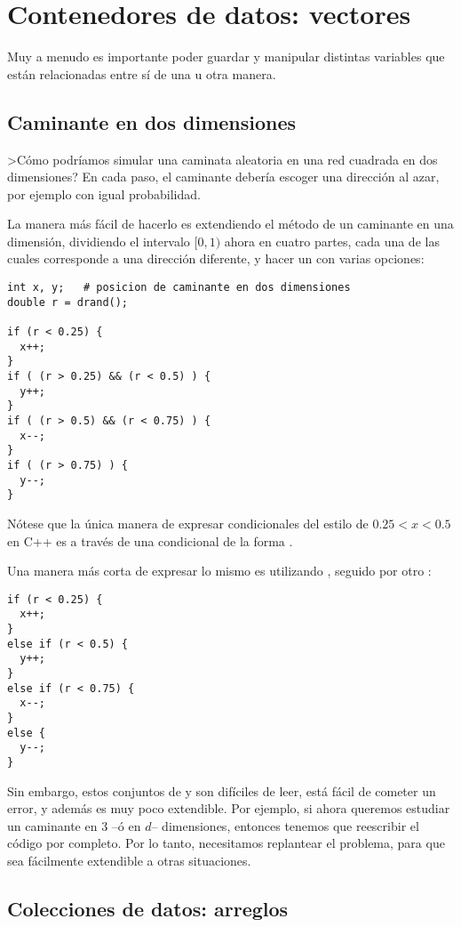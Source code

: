 \chapter{Contenedores de datos: vectores}

Muy a menudo es importante poder guardar y manipular distintas variables que
están relacionadas entre sí de una u otra manera.

\section{Caminante en dos dimensiones}

>Cómo podríamos simular una caminata aleatoria en una red cuadrada en dos
dimensiones? En cada paso, el caminante debería escoger una dirección al azar,
por ejemplo con igual probabilidad.

La manera más fácil de hacerlo es extendiendo el método de un caminante en una
dimensión, dividiendo el intervalo $[0,1)$ ahora en cuatro partes, cada una de
las cuales corresponde a una dirección diferente, y hacer un  con
varias opciones:
\begin{lstlisting}
int x, y;	# posicion de caminante en dos dimensiones
double r = drand();

if (r < 0.25) {
  x++;
}
if ( (r > 0.25) && (r < 0.5) ) {
  y++;
}
if ( (r > 0.5) && (r < 0.75) ) {
  x--;
}
if ( (r > 0.75) ) {
  y--;
}
\end{lstlisting}
Nótese que la única manera de expresar condicionales del estilo de $0.25 < x <
0.5$ en C++ es a través de una condicional de la forma \inl{&&}.

Una manera más corta de expresar lo mismo es utilizando , seguido por
otro :
\begin{lstlisting}
if (r < 0.25) {
  x++;
}
else if (r < 0.5) {
  y++;
}
else if (r < 0.75) {
  x--;
}
else {
  y--;
}
\end{lstlisting}

Sin embargo, estos conjuntos de  y  son difíciles de leer,
está fácil de cometer un error, y además es muy poco extendible. Por ejemplo,
si ahora queremos estudiar un caminante en $3$ --ó en $d$-- dimensiones,
entonces tenemos que reescribir el código por completo.  Por lo tanto,
necesitamos replantear el problema, para que sea fácilmente extendible a otras
situaciones.


\section{Colecciones de datos: arreglos}

